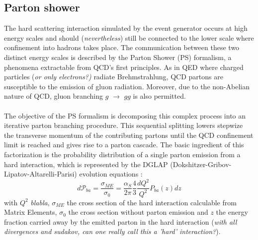 \subsection{Parton shower} \label{sec::PS}
The hard scattering interaction simulated by the event generator occurs at high energy scales and should (\textit{nevertheless}) still be connected to the lower scale where confinement into hadrons takes place. The communication between these two distinct energy scales is described by the Parton Shower (PS) formalism, a phenomena extractable from QCD's first principles.
As in QED where charged particles (\textit{or only electrons?)} radiate Brehmstrahlung, QCD partons are susceptible to the emission of gluon radiation. Moreover, due to the non-Abelian nature of QCD, gluon branching $g$ $\rightarrow$ $gg$ is also permitted.\\
\\
The objective of the PS formalism is decomposing this complex process into an iterative parton branching procedure. This sequential splitting lowers stepwize the transverse momentum of the contributing partons until the QCD confinement limit is reached and gives rise to a parton cascade. The basic ingredient of this factorization is the probability distribution of a single parton emission from a hard interaction, which is represented by the DGLAP (Dokshitzer-Gribov-Lipatov-Altarelli-Parisi) evolution equations \cite{}:
\begin{equation}\label{eq::PSProb_NoSudakov}
 d\mathcal{P}_{ba} = \dfrac{\sigma_{ME}}{\sigma_{0}} = \dfrac{\alpha_{S}}{2\pi} \frac{4}{3} \frac{dQ^{2}}{Q^{2}} P_{ba}(z)dz
\end{equation}
with $Q^{2}$ \textit{blabla}, $\sigma_{ME}$ the cross section of the hard interaction calculable from Matrix Elements, $\sigma_{0}$ the cross section without parton emission and $z$ the energy fraction carried away by the emitted parton in the hard interaction (\textit{with all divergences and sudakov, can one really call this a 'hard' interaction?}).\\
